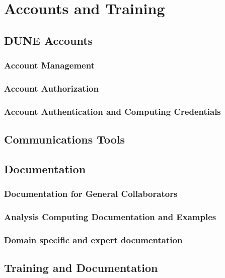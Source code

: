 %
\chapter{Accounts and Training} %
\section{DUNE Accounts}
\subsection{Account Management}
\subsection{Account Authorization}
\subsection{Account Authentication and Computing Credentials}
\section{Communications Tools}
\section{Documentation}
\subsection{Documentation for General Collaborators}
\subsection{Analysis Computing Documentation and Examples}
\subsection{Domain specific and expert documentation}
\section{Training and Documentation}

